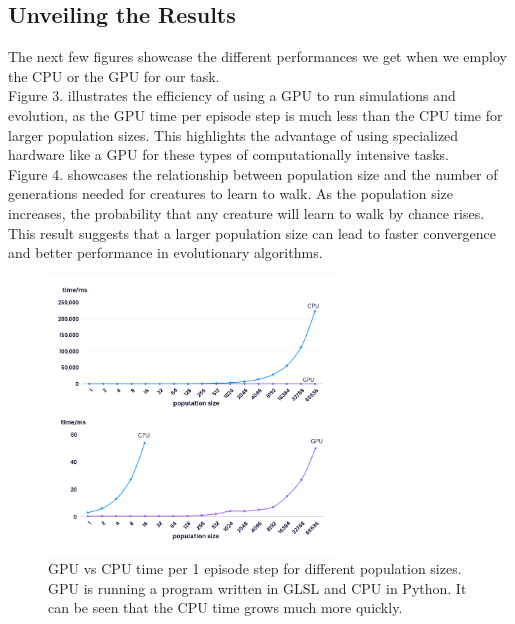 
\subsection{\LARGE Unveiling the Results}


The next few figures showcase the different performances we get when we employ the CPU or the GPU for our task. \\


Figure 3. illustrates the efficiency of using a GPU to run simulations and evolution, as the GPU time per episode step is much less than the CPU time for larger population sizes. This highlights the advantage of using specialized hardware like a GPU for these types of computationally intensive tasks. \\


Figure 4. showcases the relationship between population size and the number of generations needed for creatures to learn to walk. As the population size increases, the probability that any creature will learn to walk by chance rises. This result suggests that a larger population size can lead to faster convergence and better performance in evolutionary algorithms. \\


\begin{figure}[H]
    \includegraphics[width=3in]{popsizetime.png} %
    \caption{GPU vs CPU time per 1 episode step for different population sizes. GPU is running a program written in GLSL and CPU in Python. It can be seen that the CPU time grows much more quickly.}
    \label{fig:struktura} %
\end{figure}

